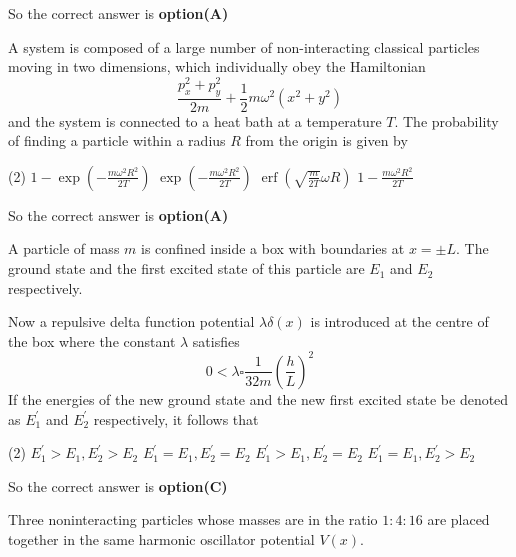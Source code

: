 \begin{questions}
\begin{answer}
	So the correct answer is \textbf{option(A)}
\end{answer}
\begin{minipage}{\textwidth}
	\question A system is composed of a large number of non-interacting classical particles moving in two dimensions, which individually obey the Hamiltonian
	$$
	\frac{p_{x}^{2}+p_{y}^{2}}{2 m}+\frac{1}{2} m \omega^{2}\left(x^{2}+y^{2}\right)
	$$
	and the system is connected to a heat bath at a temperature $T$.
	The probability of finding a particle within a radius $R$ from the origin is given by
\end{minipage}
\begin{tasks}(2)
	\task[\textbf{A.}] $1-\exp \left(-\frac{m \omega^{2} R^{2}}{2 T}\right)$
	\task[\textbf{B.}] $\exp \left(-\frac{m \omega^{2} R^{2}}{2 T}\right)$
	\task[\textbf{C.}] $\operatorname{erf}\left(\sqrt{\frac{m}{2 T}} \omega R\right)$
	\task[\textbf{D.}] $1-\frac{m \omega^{2} R^{2}}{2 T}$
\end{tasks}
\begin{answer}
	So the correct answer is \textbf{option(A)}
\end{answer}
\begin{minipage}{\textwidth}
	\question A particle of mass $m$ is confined inside a box with boundaries at $x=\pm L$. The ground state and the first excited state of this particle are $E_{1}$ and $E_{2}$ respectively.
	
	Now a repulsive delta function potential $\lambda \delta(x)$ is introduced at the centre of the box where the constant $\lambda$ satisfies
	$$
	0<\lambda \square \frac{1}{32 m}\left(\frac{h}{L}\right)^{2}
	$$
	If the energies of the new ground state and the new first excited state be denoted as $E_{1}^{\prime}$ and $E_{2}^{\prime}$ respectively, it follows that
\end{minipage}
\begin{tasks}(2)
	\task[\textbf{A.}] $E_{1}^{\prime}>E_{1}, E_{2}^{\prime}>E_{2}$
	\task[\textbf{B.}] $E_{1}^{\prime}=E_{1}, E_{2}^{\prime}=E_{2}$
	\task[\textbf{C.}]   $E_{1}^{\prime}>E_{1}, E_{2}^{\prime}=E_{2}$
	\task[\textbf{D.}] $E_{1}^{\prime}=E_{1}, E_{2}^{\prime}>E_{2}$
\end{tasks}
\begin{answer}
	So the correct answer is \textbf{option(C)}
\end{answer}
\begin{minipage}{\textwidth}
	\question Three noninteracting particles whose masses are in the ratio $1: 4: 16$ are placed together in the same harmonic oscillator potential $V(x)$.
	

\end{minipage}
\end{questions}
